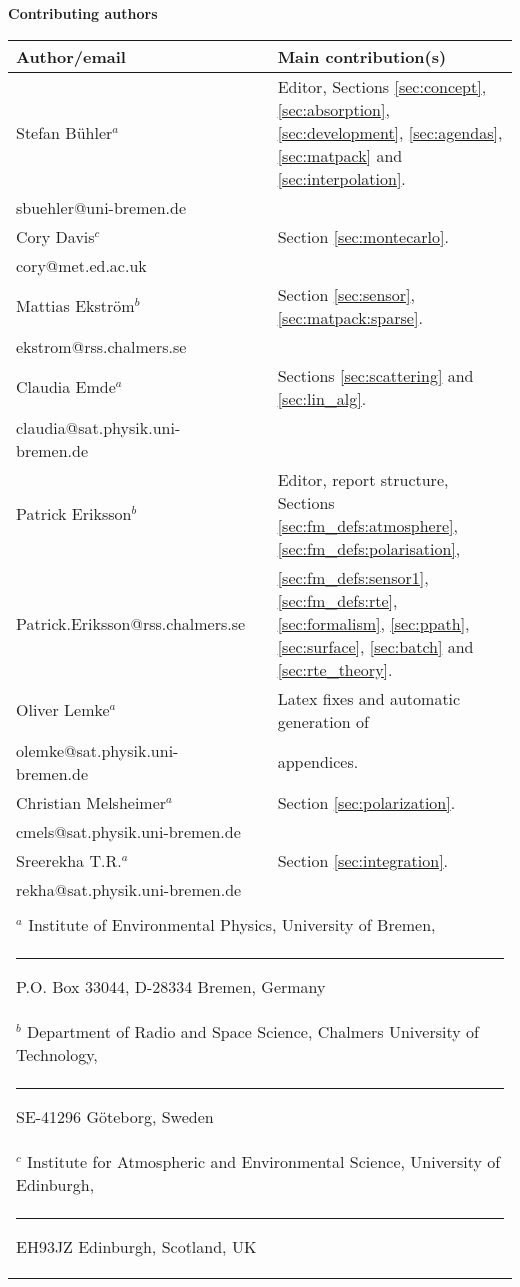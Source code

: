 %
\newpage
\thispagestyle{plain}
%
\begin{center}

{\Large \bf Contributing authors}
\vspace*{20mm}

\begin{tabular}{lp{10mm}l}
\hline
{\bf Author/email} & & {\bf Main contribution(s)} \\
\hline
  Stefan B\"uhler$^a$ & & Editor, Sections \ref{sec:concept},  
     \ref{sec:absorption}, \ref{sec:development}, \ref{sec:agendas},
     \ref{sec:matpack} and \ref{sec:interpolation}.\\
  sbuehler@uni-bremen.de & &        \\
\hline
  Cory Davis$^c$ & & Section \ref{sec:montecarlo}. \\
  cory@met.ed.ac.uk & & \\
\hline
  Mattias Ekstr\"om$^b$ & & Section \ref{sec:sensor}, 
     \ref{sec:matpack:sparse}. \\
  ekstrom@rss.chalmers.se & & \\
\hline
  Claudia Emde$^a$ & & Sections \ref{sec:scattering} and \ref{sec:lin_alg}.\\
  claudia@sat.physik.uni-bremen.de & & \\
\hline
  Patrick Eriksson$^b$ &  & Editor, report structure, 
    Sections \ref{sec:fm_defs:atmosphere}, \ref{sec:fm_defs:polarisation}, \\
  Patrick.Eriksson@rss.chalmers.se & & 
    \ref{sec:fm_defs:sensor1}, \ref{sec:fm_defs:rte}, \ref{sec:formalism}, 
    \ref{sec:ppath}, \ref{sec:surface}, \ref{sec:batch} and 
    \ref{sec:rte_theory}.\\
\hline
  Oliver Lemke$^a$ & & Latex fixes and automatic generation of\\
  olemke@sat.physik.uni-bremen.de & & appendices.\\
\hline
  Christian Melsheimer$^a$ & & Section \ref{sec:polarization}.\\
  cmels@sat.physik.uni-bremen.de & & \\
\hline
  Sreerekha T.R.$^a$ & & Section \ref{sec:integration}.\\
  rekha@sat.physik.uni-bremen.de & & \\
\hline
 && \\
\multicolumn{3}{l}{ $^a$
      Institute of Environmental Physics, University of Bremen, } \\
\multicolumn{3}{l}{\rule{1.5ex}{0pt}P.O. Box 33044, D-28334 Bremen, Germany} \\
\multicolumn{3}{l}{ $^b$
      Department of Radio and Space Science, 
      Chalmers University of Technology,} \\
\multicolumn{3}{l}{\rule{1.5ex}{0pt}SE-41296 G\"oteborg, Sweden} \\
\multicolumn{3}{l}{ $^c$
      Institute for Atmospheric and Environmental Science, 
      University of Edinburgh,} \\
\multicolumn{3}{l}{\rule{1.5ex}{0pt}EH93JZ Edinburgh, Scotland, UK} \\


\end{tabular}
\end{center}
